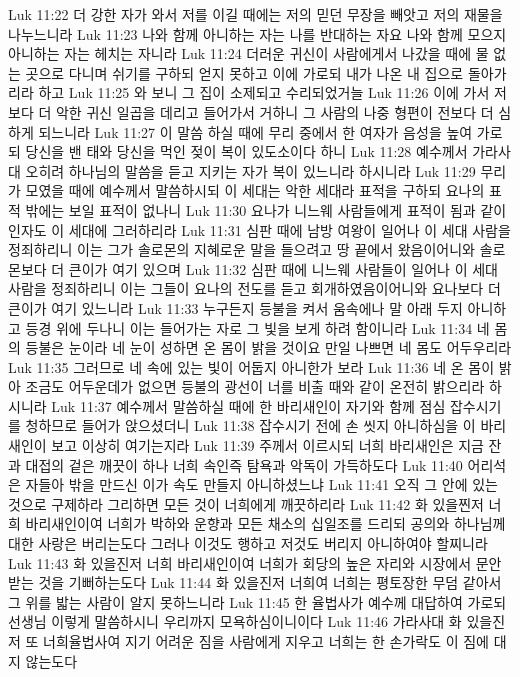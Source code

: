 Luk 11:22  더 강한 자가 와서 저를 이길 때에는 저의 믿던 무장을 빼앗고 저의 재물을 나누느니라
Luk 11:23  나와 함께 아니하는 자는 나를 반대하는 자요 나와 함께 모으지 아니하는 자는 헤치는 자니라
Luk 11:24  더러운 귀신이 사람에게서 나갔을 때에 물 없는 곳으로 다니며 쉬기를 구하되 얻지 못하고 이에 가로되 내가 나온 내 집으로 돌아가리라 하고
Luk 11:25  와 보니 그 집이 소제되고 수리되었거늘
Luk 11:26  이에 가서 저보다 더 악한 귀신 일곱을 데리고 들어가서 거하니 그 사람의 나중 형편이 전보다 더 심하게 되느니라
Luk 11:27  이 말씀 하실 때에 무리 중에서 한 여자가 음성을 높여 가로되 당신을 밴 태와 당신을 먹인 젖이 복이 있도소이다 하니
Luk 11:28  예수께서 가라사대 오히려 하나님의 말씀을 듣고 지키는 자가 복이 있느니라 하시니라
Luk 11:29  무리가 모였을 때에 예수께서 말씀하시되 이 세대는 악한 세대라 표적을 구하되 요나의 표적 밖에는 보일 표적이 없나니
Luk 11:30  요나가 니느웨 사람들에게 표적이 됨과 같이 인자도 이 세대에 그러하리라
Luk 11:31  심판 때에 남방 여왕이 일어나 이 세대 사람을 정죄하리니 이는 그가 솔로몬의 지혜로운 말을 들으려고 땅 끝에서 왔음이어니와 솔로몬보다 더 큰이가 여기 있으며
Luk 11:32  심판 때에 니느웨 사람들이 일어나 이 세대 사람을 정죄하리니 이는 그들이 요나의 전도를 듣고 회개하였음이어니와 요나보다 더 큰이가 여기 있느니라
Luk 11:33  누구든지 등불을 켜서 움속에나 말 아래 두지 아니하고 등경 위에 두나니 이는 들어가는 자로 그 빛을 보게 하려 함이니라
Luk 11:34  네 몸의 등불은 눈이라 네 눈이 성하면 온 몸이 밝을 것이요 만일 나쁘면 네 몸도 어두우리라
Luk 11:35  그러므로 네 속에 있는 빛이 어둡지 아니한가 보라
Luk 11:36  네 온 몸이 밝아 조금도 어두운데가 없으면 등불의 광선이 너를 비출 때와 같이 온전히 밝으리라 하시니라
Luk 11:37  예수께서 말씀하실 때에 한 바리새인이 자기와 함께 점심 잡수시기를 청하므로 들어가 앉으셨더니
Luk 11:38  잡수시기 전에 손 씻지 아니하심을 이 바리새인이 보고 이상히 여기는지라
Luk 11:39  주께서 이르시되 너희 바리새인은 지금 잔과 대접의 겉은 깨끗이 하나 너희 속인즉 탐욕과 악독이 가득하도다
Luk 11:40  어리석은 자들아 밖을 만드신 이가 속도 만들지 아니하셨느냐
Luk 11:41  오직 그 안에 있는 것으로 구제하라 그리하면 모든 것이 너희에게 깨끗하리라
Luk 11:42  화 있을찐저 너희 바리새인이여 너희가 박하와 운향과 모든 채소의 십일조를 드리되 공의와 하나님께 대한 사랑은 버리는도다 그러나 이것도 행하고 저것도 버리지 아니하여야 할찌니라
Luk 11:43  화 있을진저 너희 바리새인이여 너희가 회당의 높은 자리와 시장에서 문안 받는 것을 기뻐하는도다
Luk 11:44  화 있을진저 너희여 너희는 평토장한 무덤 같아서 그 위를 밟는 사람이 알지 못하느니라
Luk 11:45  한 율법사가 예수께 대답하여 가로되 선생님 이렇게 말씀하시니 우리까지 모욕하심이니이다
Luk 11:46  가라사대 화 있을진저 또 너희율법사여 지기 어려운 짐을 사람에게 지우고 너희는 한 손가락도 이 짐에 대지 않는도다
